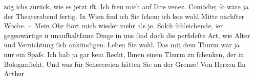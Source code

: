 \begin{ledgroupsized}[t]{13cm}
               zög ichs zurück, wie es jetzt iſt.\pend
           \pstart
           Ich freu mich auf Ihre venez.
                  Comödie; ſo wäre ja der Theaterabend fertig. In Wien find ich Sie ſchon; ich ko{\geminationm}e wohl Mitte
               nächſter Woche.\pend
           \pstart
           – Mein Ohr ſtört mich wieder mehr als je. Solch ſchleichende, {\pb}i{\geminationm}er gegenwärtige u unaufhaltſame Dinge in uns ſind doch
               die perfideſte Art, wie Alter und Vernichtung ſich ankündigen.\pend
           \pstart
           Leben Sie wohl. Das mit dem Thurm war ja nur
               ein Spaſs. Ich hab ja gar kein Recht, Ihnen einen Thurm zu ſchenken, der in Bolognaſteht. Und was für Scherereien hätten Sie an der
               Grenze!\pend
           \pstart Von Herzen Ihr \spacefill\mbox{Arthur}\pend{}
         
         \endnumbering{}\end{ledgroupsized}  \newcommand{\dateiname}{L00850}\newcommand{\titel}{Arthur Schnitzler an Hugo von Hofmannsthal, 4. 10. 1898}\newcommand{\editorInnen}{Martin Anton Müller und Gerd-Hermann Susen}
      